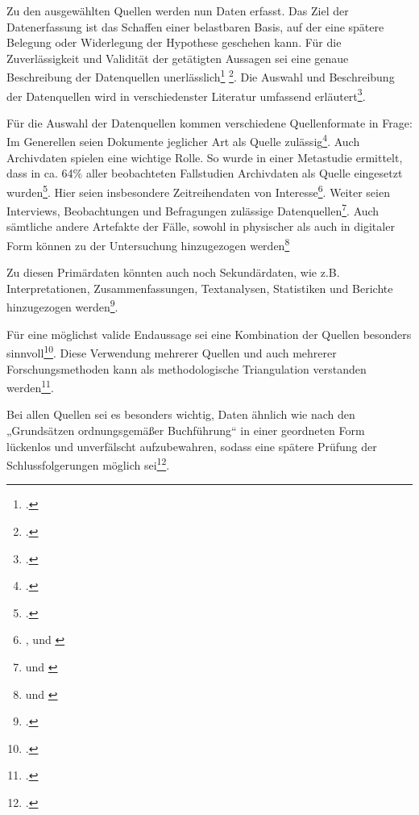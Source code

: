 Zu den ausgewählten Quellen werden nun Daten erfasst. Das Ziel der
Datenerfassung ist das Schaffen einer belastbaren Basis, auf der eine
spätere Belegung oder Widerlegung der Hypothese geschehen kann. Für die
Zuverlässigkeit und Validität der getätigten Aussagen sei eine genaue
Beschreibung der Datenquellen unerlässlich\footcite[Vgl. ][S. 612]{dubeRigorInformationSystems2003} \footcite[Vgl. ][S. 614]{dubeRigorInformationSystems2003}. Die Auswahl und
Beschreibung der Datenquellen wird in verschiedenster Literatur
umfassend erläutert\footcite[Vgl. ][S. 560-569]{girtlerMethodenFeldforschung2001}.

  Für die Auswahl der Datenquellen kommen verschiedene Quellenformate in
Frage: Im Generellen seien Dokumente jeglicher Art als Quelle
zulässig\footcite[Vgl. ][S.10]{gothlichFallstudienAlsForschungsmethode2003}.
Auch Archivdaten spielen eine wichtige Rolle. So wurde in einer
Metastudie ermittelt, dass in ca. 64\% aller beobachteten Fallstudien
Archivdaten als Quelle eingesetzt wurden\footcite[Vgl. ][S. 614]{dubeRigorInformationSystems2003}. Hier seien insbesondere Zeitreihendaten von Interesse\footnote{\cite[Vgl. ][]{benbasatCaseResearchStrategy1987}, \cite[][]{eisenhardtBuildingTheoriesCase1989} und \cite[][S. 612]{dubeRigorInformationSystems2003}}. Weiter seien Interviews,
Beobachtungen und Befragungen zulässige Datenquellen\footnote{\cite[Vgl. ][]{benbasatCaseResearchStrategy1987} und \cite[][S. 612]{dubeRigorInformationSystems2003}}. Auch sämtliche andere Artefakte der Fälle, sowohl in
physischer als auch in digitaler Form können zu der Untersuchung
hinzugezogen werden\footnote{\cite[Vgl. ][S. 10]{gothlichFallstudienAlsForschungsmethode2003} und \cite[][S. 612]{dubeRigorInformationSystems2003}}

Zu diesen Primärdaten könnten auch noch Sekundärdaten, wie z.B.
Interpretationen, Zusammenfassungen, Textanalysen, Statistiken und
Berichte hinzugezogen werden\footcite[Vgl. ][S. 11]{gothlichFallstudienAlsForschungsmethode2003}.

Für eine möglichst valide Endaussage sei eine Kombination der Quellen
besonders sinnvoll\footcite[Vgl. ][S. 10]{gothlichFallstudienAlsForschungsmethode2003}.
Diese Verwendung mehrerer Quellen und auch mehrerer Forschungsmethoden
kann als methodologische Triangulation verstanden werden\footcite[Vgl. ][S. 10]{gothlichFallstudienAlsForschungsmethode2003}.

Bei allen Quellen sei es besonders wichtig, Daten ähnlich wie nach den
„Grundsätzen ordnungsgemä\ss er Buchführung`` in einer geordneten Form
lückenlos und unverfälscht aufzubewahren, sodass eine spätere Prüfung
der Schlussfolgerungen möglich sei\footcite[Vgl. ][S. 11]{gothlichFallstudienAlsForschungsmethode2003}.

